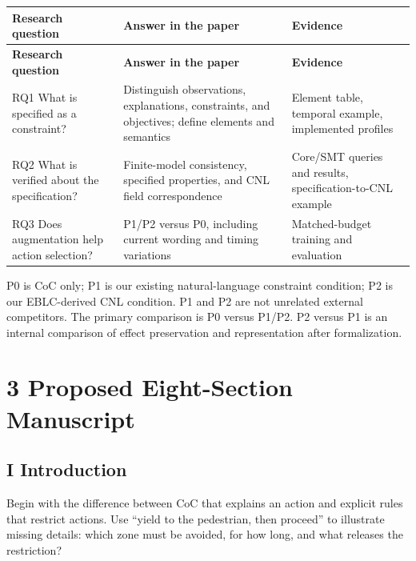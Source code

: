 \documentclass[11pt,a4paper]{article}
\begin{document}
\begingroup\small
\begin{longtable}{@{}>{\raggedright\arraybackslash}p{}>{\raggedright\arraybackslash}p{}>{\raggedright\arraybackslash}p{}@{}}
\toprule
\textbf{Research question} & \textbf{Answer in the paper} & \textbf{Evidence} \\
\midrule\endfirsthead
\toprule
\textbf{Research question} & \textbf{Answer in the paper} & \textbf{Evidence} \\
\midrule\endhead
\bottomrule\endfoot
RQ1 What is specified as a constraint? & Distinguish observations, explanations, constraints, and objectives; define elements and semantics & Element table, temporal example, implemented profiles \\
RQ2 What is verified about the specification? & Finite-model consistency, specified properties, and CNL field correspondence & Core/SMT queries and results, specification-to-CNL example \\
RQ3 Does augmentation help action selection? & P1/P2 versus P0, including current wording and timing variations & Matched-budget training and evaluation \\
\end{longtable}
\endgroup

P0 is CoC only; P1 is our existing natural-language constraint condition; P2 is our EBLC-derived CNL condition. P1 and P2 are not unrelated external competitors. The primary comparison is P0 versus P1/P2. P2 versus P1 is an internal comparison of effect preservation and representation after formalization.\par

\section*{3 Proposed Eight-Section Manuscript}

\subsection*{I Introduction}

Begin with the difference between CoC that explains an action and explicit rules that restrict actions. Use “yield to the pedestrian, then proceed” to illustrate missing details: which zone must be avoided, for how long, and what releases the restriction?\par
\end{document}
